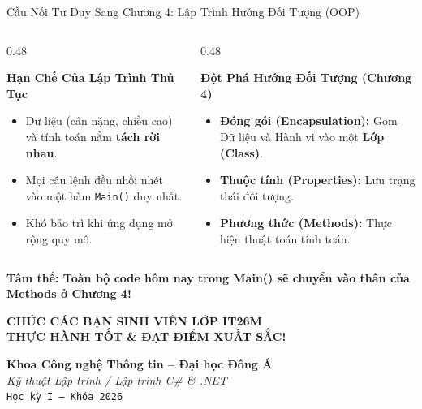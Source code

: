 \documentclass[aspectratio=169, 10pt]{beamer}
\begin{document}
\begin{frame}{Cầu Nối Tư Duy Sang Chương 4: Lập Trình Hướng Đối Tượng (OOP)}
  \begin{columns}[T]
    \begin{column}{0.48\textwidth}
      \begin{alertblock}{\textbf{Hạn Chế Của Lập Trình Thủ Tục}}
        \small
        \begin{itemize}
          \item Dữ liệu (cân nặng, chiều cao) và tính toán nằm \textbf{tách rời nhau}.
          \item Mọi câu lệnh đều nhồi nhét vào một hàm \texttt{Main()} duy nhất.
          \item Khó bảo trì khi ứng dụng mở rộng quy mô.
        \end{itemize}
      \end{alertblock}
    \end{column}
    \begin{column}{0.48\textwidth}
      \begin{exampleblock}{\textbf{Đột Phá Hướng Đối Tượng (Chương 4)}}
        \small
        \begin{itemize}
          \item \textbf{Đóng gói (Encapsulation):} Gom Dữ liệu và Hành vi vào một \textbf{Lớp (Class)}.
          \item \textbf{Thuộc tính (Properties):} Lưu trạng thái đối tượng.
          \item \textbf{Phương thức (Methods):} Thực hiện thuật toán tính toán.
        \end{itemize}
      \end{exampleblock}
    \end{column}
  \end{columns}
  \vskip5pt
  \begin{center}
    \small\textbf{\color{UniNavy}Tâm thế: Toàn bộ code hôm nay trong Main() sẽ chuyển vào thân của Methods ở Chương 4!}
  \end{center}
\end{frame}

\begin{frame}[plain]
  \begin{center}
    \vspace{2cm}
    {\huge\color{UniNavy}\textbf{CHÚC CÁC BẠN SINH VIÊN LỚP IT26M}}\\[0.4cm]
    {\LARGE\color{CSharpPurple}\textbf{THỰC HÀNH TỐT \& ĐẠT ĐIỂM XUẤT SẮC!}}\\[0.8cm]
    \begin{tcolorbox}[colback=UniLightBlue!30,colframe=UniNavy,width=0.7\textwidth]
      \centering
      \textbf{Khoa Công nghệ Thông tin -- Đại học Đông Á}\\
      \textit{Kỹ thuật Lập trình / Lập trình C\# \& .NET}\\
      \texttt{Học kỳ I -- Khóa 2026}
    \end{tcolorbox}
  \end{center}
\end{frame}
\end{document}
